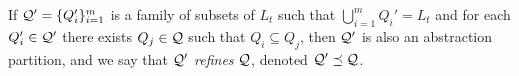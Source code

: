 If $\mathcal{Q}' =  \{Q_i'\}_{i=1}^m$ is a family of subsets of $L_t$ such that $\bigcup_{i=1}^m Q_i' = L_t$ and for each $Q_i' \in \mathcal{Q}'$ there exists $Q_j \in \mathcal{Q}$ such that $Q_i \subseteq Q_j$, then $\mathcal{Q}'$ is also an abstraction partition, and we say that $\mathcal{Q}'$ \emph{refines} $\mathcal{Q}$, denoted $\mathcal{Q}' \preceq \mathcal{Q}$.

